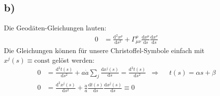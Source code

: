 \documentclass[a4paper,12pt]{article}
\newcommand{\tecxt}{}
\begin{document}
\subsection*{b)}Die Geodäten-Gleichungen lauten:
\begin{align*}
0&=\frac{\tecxt\text{d}^2x^\rho}{\tecxt\text{d}s^2}+\Gamma^\rho_{\mu\nu}\frac{\tecxt\text{d}x^\mu}{\tecxt\text{d}s}\frac{\tecxt\text{d}x^\nu}{\tecxt\text{d}s}
\end{align*}
Die Gleichungen können für unsere Christoffel-Symbole einfach mit $x^j(s)\equiv \tecxt\text{const}$ gelöst werden:
\begin{align*}
0&=\frac{\tecxt\text{d}^2t(s)}{\tecxt\text{d}s^2}+a\dot{a}\sum_j\frac{\tecxt\text{d}x^j(s)}{\tecxt\text{d}s}=\frac{\tecxt\text{d}^2t(s)}{\tecxt\text{d}s^2}&\Rightarrow &&t(s)=\alpha s+\beta\\
0&=\frac{\tecxt\text{d}^2x^j(s)}{\tecxt\text{d}s^2}+\frac{\dot{a}}{a}\frac{\tecxt\text{d}t(s)}{\tecxt\text{d}s}\frac{\tecxt\text{d}x^j(s)}{\tecxt\text{d}s}\equiv 0
\end{align*}
\end{document}
